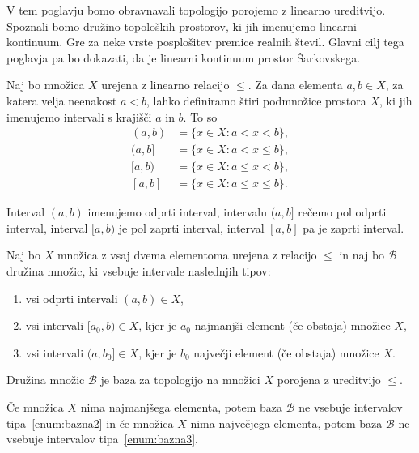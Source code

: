 \documentclass[../TG_magistrsko_delo_sections.tex]{subfiles}
\begin{document}
V tem poglavju bomo obravnavali topologijo porojemo z linearno ureditvijo. Spoznali bomo družino topoloških prostorov, ki jih imenujemo linearni kontinuum. Gre za neke vrste posplošitev premice realnih števil. Glavni cilj tega poglavja pa bo dokazati, da je linearni kontinuum prostor Šarkovskega.

Naj bo množica $X$ urejena z linearno relacijo $\leq$. Za dana elementa $a, b \in X$, za katera velja neenakost $a<b$, lahko definiramo štiri podmnožice prostora $X$, ki jih imenujemo intervali s krajišči $a$ in $b$. To so
\begin{equation*} %
\begin{split}
(a, b) &= \{x \in X: a< x <b\}, \\ 
(a, b] &= \{x \in X: a< x \leq b\}, \\ 
[a, b) &= \{x \in X: a \leq x< b\}, \\ 
[a, b] &= \{x \in X: a \leq x \leq b\}.
\end{split}
\end{equation*}

\begin{opomba}\label{op:intervali}
Interval $(a, b)$ imenujemo odprti interval, intervalu $(a, b]$ rečemo pol odprti interval, interval $[a, b)$ je pol zaprti interval, interval $[a, b]$ pa je zaprti interval.
\end{opomba}

\begin{definicija}
Naj bo $X$ množica z vsaj dvema elementoma urejena z relacijo $\leq$ in naj bo $\mathcal{B}$ družina množic, ki vsebuje intervale naslednjih tipov:
\begin{enumerate}
\item vsi odprti intervali $(a, b) \in X$, \label{enum:bazna1}
\item vsi intervali $[a_0, b) \in X$, kjer je $a_0$ najmanjši element (če obstaja) množice $X$, \label{enum:bazna2}
\item vsi intervali $(a, b_0] \in X$, kjer je $b_0$ največji element (če obstaja) množice $X$. \label{enum:bazna3}
\end{enumerate}
Družina množic $\mathcal{B}$ je baza za topologijo na množici $X$ porojena z ureditvijo $\leq$.
\end{definicija}

\begin{opomba}\label{op:ekstremi}
Če množica $X$ nima najmanjšega elementa, potem baza $\mathcal{B}$ ne vsebuje intervalov tipa~\ref{enum:bazna2} in če množica $X$ nima največjega elementa, potem baza $\mathcal{B}$ ne vsebuje intervalov tipa~\ref{enum:bazna3}.
\end{opomba}
\end{document}
